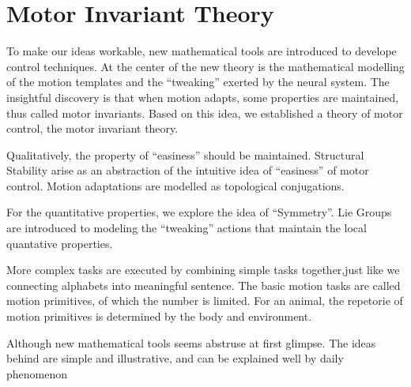 \section{Motor Invariant Theory}
%
%
%
To make our ideas workable, new mathematical tools are introduced to develope control techniques.
At the center of the new theory is the mathematical modelling of the motion templates and the ``tweaking'' exerted by the neural system.
The insightful discovery is that when motion adapts, some properties are maintained, thus called motor invariants.
Based on this idea, we established a theory of motor control, the motor invariant theory.


Qualitatively, the property of ``easiness'' should be maintained.
Structural Stability arise as an abstraction of the intuitive idea of ``easiness'' of motor control.
Motion adaptations are modelled as topological conjugations. 

For the quantitative properties, we explore the idea of ``Symmetry''.
Lie Groups are introduced to modeling the ``tweaking'' actions that maintain the local quantative properties.


More complex tasks are executed by combining simple tasks together,just like we connecting alphabets into meaningful sentence.
The basic motion tasks are called motion primitives, of which the number is limited.
For an animal, the repetorie of motion primitives is determined by the body and environment.


Although new mathematical tools seems abstruse at first glimpse.
The ideas behind are simple and illustrative, and can be explained well by daily phenomenon



